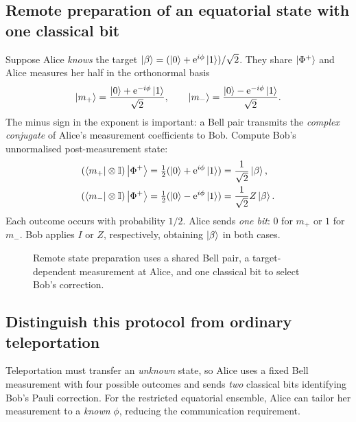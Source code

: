 \subsection{Remote preparation of an equatorial state with one classical bit}
Suppose Alice \emph{knows} the target $\left\lvert \beta\right\rangle=(\left\lvert 0\right\rangle+\mathrm{e}^{i\phi}\left\lvert 1\right\rangle)/\sqrt2$. They share $\left\lvert \Phi^+\right\rangle$ and Alice measures her half in the orthonormal basis
\begin{equation}
\left\lvert m_+\right\rangle=\frac{\left\lvert 0\right\rangle+\mathrm{e}^{-i\phi}\left\lvert 1\right\rangle}{\sqrt2},\qquad
\left\lvert m_-\right\rangle=\frac{\left\lvert 0\right\rangle-\mathrm{e}^{-i\phi}\left\lvert 1\right\rangle}{\sqrt2}.
\end{equation}
The minus sign in the exponent is important: a Bell pair transmits the \emph{complex conjugate} of Alice's measurement coefficients to Bob. Compute Bob's unnormalised post-measurement state:
\begin{align}
(\left\langle m_+\right\rvert\otimes\mathbb{I})\left\lvert \Phi^+\right\rangle&=\tfrac12(\left\lvert 0\right\rangle+\mathrm{e}^{i\phi}\left\lvert 1\right\rangle)=\frac1{\sqrt2}\left\lvert \beta\right\rangle,\\
(\left\langle m_-\right\rvert\otimes\mathbb{I})\left\lvert \Phi^+\right\rangle&=\tfrac12(\left\lvert 0\right\rangle-\mathrm{e}^{i\phi}\left\lvert 1\right\rangle)=\frac1{\sqrt2}Z\left\lvert \beta\right\rangle.
\end{align}
Each outcome occurs with probability $1/2$. Alice sends \emph{one bit}: $0$ for $m_+$ or $1$ for $m_-$. Bob applies $I$ or $Z$, respectively, obtaining $\left\lvert \beta\right\rangle$ in both cases.

\begin{figure}[htbp]
\centering
{}
\caption{Remote state preparation uses a shared Bell pair, a target-dependent measurement at Alice, and one classical bit to select Bob's correction.}
\label{fig:rsp}
\end{figure}

\subsection{Distinguish this protocol from ordinary teleportation}
Teleportation must transfer an \emph{unknown} state, so Alice uses a fixed Bell measurement with four possible outcomes and sends \emph{two} classical bits identifying Bob's Pauli correction. For the restricted equatorial ensemble, Alice can tailor her measurement to a \emph{known} $\phi$, reducing the communication requirement.

